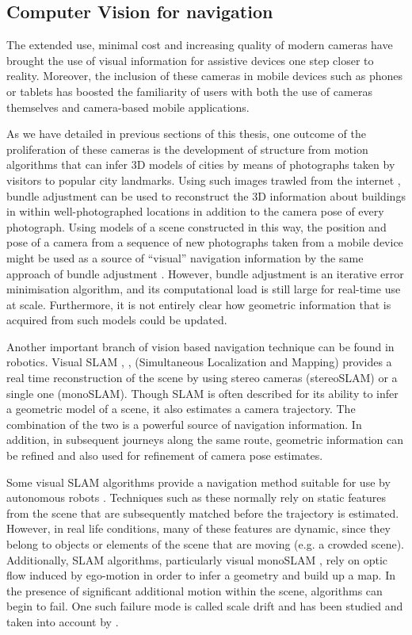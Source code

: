 \subsection{Computer Vision for navigation}

The extended use, minimal cost and increasing quality of modern cameras have brought the use of visual information for assistive devices one step closer to reality. Moreover, the inclusion of these cameras in mobile devices such as phones or tablets has boosted the familiarity of users with both the use of cameras themselves and camera-based mobile applications.

As we have detailed in previous sections of this thesis, one outcome of the proliferation of these cameras is the development of structure from motion algorithms that can infer 3D models of cities \citep{agarwal2011building} by means of photographs taken by visitors to popular city landmarks. Using such images trawled from the internet \citep{snavely2006photo}, bundle adjustment can be used to reconstruct the 3D information about buildings in within well-photographed locations in addition to the camera pose of every photograph. Using models of a scene constructed in this way, the position and pose of a camera from a sequence of new photographs taken from a mobile device might be used as a source of ``visual'' navigation information by the same approach of bundle adjustment \citep{ventura2014global}.  However, bundle adjustment is an iterative error minimisation algorithm, and its computational load is still large for real-time use at scale.  Furthermore, it is not entirely clear how geometric information that is acquired from such models could be updated.

Another important branch of vision based navigation technique can be found in robotics. Visual SLAM \citep{konolige2007frame}, \citep{engelhard2011real},\citep{neira2008guest} (Simultaneous Localization and Mapping) provides a real time reconstruction of the scene by using stereo cameras (stereoSLAM) or a single one (monoSLAM). Though SLAM is often described for its ability to infer a geometric model of a scene, it also estimates a camera trajectory.  The combination of the two is a powerful source of navigation information. In addition, in subsequent journeys along the same route, geometric information can be refined and also used for refinement of camera pose estimates.

Some visual SLAM algorithms provide a navigation method suitable for use by autonomous robots \citep{konolige2007frame}. Techniques such as these normally rely on static features from the scene that are subsequently matched before the trajectory is estimated. However, in real life conditions, many of these features are dynamic, since they belong to objects or elements of the scene that are moving (e.g. a crowded scene). Additionally, SLAM algorithms, particularly visual monoSLAM \citep{davison2007monoslam}, rely on optic flow induced by ego-motion in order to infer a geometry and build up a map. In the presence of significant additional motion within the scene, algorithms can begin to fail.  One such failure mode is called scale drift and has been studied and taken into account by \cite{strasdat2010scale}. 

